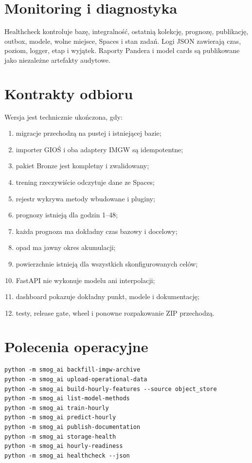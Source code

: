 \documentclass[11pt,a4paper,oneside]{article}
\begin{document}
\section{Monitoring i diagnostyka}

Healthcheck kontroluje bazę, integralność, ostatnią kolekcję, prognozę,
publikację, outbox, modele, wolne miejsce, Spaces i stan zadań. Logi JSON
zawierają czas, poziom, logger, etap i wyjątek. Raporty Pandera i model cards
są publikowane jako niezależne artefakty audytowe.

\section{Kontrakty odbioru}

Wersja jest technicznie ukończona, gdy:
\begin{enumerate}
  \item migracje przechodzą na pustej i istniejącej bazie;
  \item importer GIOŚ i oba adaptery IMGW są idempotentne;
  \item pakiet Bronze jest kompletny i zwalidowany;
  \item trening rzeczywiście odczytuje dane ze Spaces;
  \item rejestr wykrywa metody wbudowane i pluginy;
  \item prognozy istnieją dla godzin 1--48;
  \item każda prognoza ma dokładny czas bazowy i docelowy;
  \item opad ma jawny okres akumulacji;
  \item powierzchnie istnieją dla wszystkich skonfigurowanych celów;
  \item FastAPI nie wykonuje modelu ani interpolacji;
  \item dashboard pokazuje dokładny punkt, modele i dokumentację;
  \item testy, release gate, wheel i ponowne rozpakowanie ZIP przechodzą.
\end{enumerate}

\section{Polecenia operacyjne}

\begin{lstlisting}[style=code]
python -m smog_ai backfill-imgw-archive
python -m smog_ai upload-operational-data
python -m smog_ai build-hourly-features --source object_store
python -m smog_ai list-model-methods
python -m smog_ai train-hourly
python -m smog_ai predict-hourly
python -m smog_ai publish-documentation
python -m smog_ai storage-health
python -m smog_ai hourly-readiness
python -m smog_ai healthcheck --json
\end{lstlisting}
\end{document}
